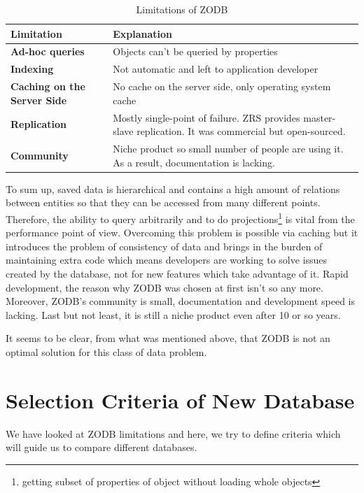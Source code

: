 \begin{table}[!ht]
  \centering
  \caption{Limitations of \textsc{ZODB}}
  \renewcommand{\arraystretch}{1.5}
  \begin{tabular}{| >{\centering\bfseries}m{2in} | >{\centering\arraybackslash}m{3.5in} |}
	\hline	
	\textbf{Limitation} & \textbf{Explanation} \\ \hline
    Ad-hoc queries & Objects can't be queried by properties \\ \hline
    Indexing & Not automatic and left to application developer \\ \hline
    Caching on the Server Side & No cache on the server side, only operating system cache \\ \hline
    Replication & Mostly single-point of failure. \textsc{ZRS} provides master-slave replication. It was commercial but open-sourced. \\ \hline
    Community & Niche product so small number of people are using it. As a result, documentation is lacking. \\ \hline	
  \end{tabular}
  \label{limitations}
\end{table}

To sum up, saved data is hierarchical and contains a high amount of relations between entities so that they can be accessed from many different points. Therefore, the ability to query arbitrarily and to do projections\footnote{getting subset of properties of object without loading whole objects} is vital from the performance point of view. Overcoming this problem is possible via caching but it introduces the problem of consistency of data and brings in the burden of maintaining extra code which means developers are working to solve issues created by the database, not for new features which take advantage of it. Rapid development, the reason why \textsc{ZODB} was chosen at first isn't so any more. Moreover, \textsc{ZODB}'s community is small, documentation and development speed is lacking. Last but not least, it is still a niche product even after 10 or so years.

It seems to be clear, from what was mentioned above, that \textsc{ZODB} is not an optimal solution for this class of data problem.

\section{Selection Criteria of New Database}

We have looked at \textsc{ZODB} limitations and here, we try to define criteria which will guide us to compare different databases.

